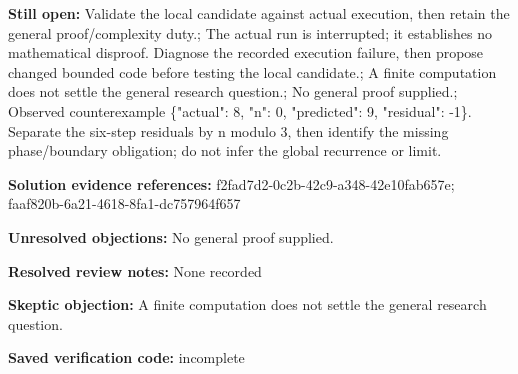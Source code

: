 \documentclass[11pt]{article}
\begin{document}
\textbf{Still open:} Validate the local candidate against actual execution, then retain the general proof/complexity duty.; The actual run is interrupted; it establishes no mathematical disproof. Diagnose the recorded execution failure, then propose changed bounded code before testing the local candidate.; A finite computation does not settle the general research question.; No general proof supplied.; Observed counterexample \{"actual": 8, "n": 0, "predicted": 9, "residual": -1\}. Separate the six-step residuals by n modulo 3, then identify the missing phase/boundary obligation; do not infer the global recurrence or limit.\par
\textbf{Solution evidence references:} f2fad7d2-0c2b-42c9-a348-42e10fab657e; faaf820b-6a21-4618-8fa1-dc757964f657\par
\textbf{Unresolved objections:} No general proof supplied.\par
\textbf{Resolved review notes:} None recorded\par
\textbf{Skeptic objection:} A finite computation does not settle the general research question.\par
\textbf{Saved verification code:} incomplete\par
\end{document}
